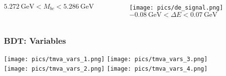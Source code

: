 \documentclass[10 pt,compress,mathserif]{beamer}
\begin{document}
\begin{frame}
\begin{small}
\begin{columns}
\begin{column}{0.5\textwidth}
\begin{center}
   $5.272\ \text{GeV}<M_{bc}<5.286\ \text{GeV}$\\
  \end{center}
  \end{column}
  \begin{column}{0.5\textwidth}
  \begin{center}
   \texttt{[image: pics/de\_signal.png]}\\
   $-0.08\ \text{GeV}<\Delta E<0.07\ \text{GeV}$\\
  \end{center}
  \end{column}
 \end{columns}
 \end{small}
\end{frame}

\begin{frame}
 \frametitle{BDT: Variables}
   \texttt{[image: pics/tmva\_vars\_1.png]} \texttt{[image: pics/tmva\_vars\_3.png]}\\
   \texttt{[image: pics/tmva\_vars\_2.png]} \texttt{[image: pics/tmva\_vars\_4.png]}
\end{frame}
\end{document}
